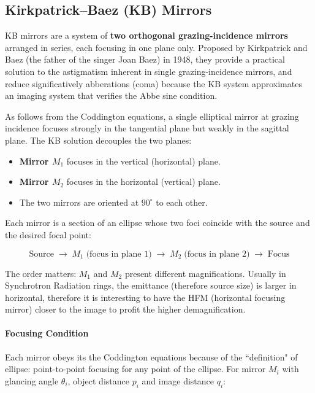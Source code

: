 \subsection{Kirkpatrick--Baez (KB) Mirrors}

\noindent
KB mirrors are a system of \textbf{two orthogonal grazing-incidence mirrors}
arranged in series, each focusing in one plane only. Proposed by Kirkpatrick
and Baez (the father of the singer Joan Baez) in 1948, they provide a practical solution to the astigmatism inherent in single grazing-incidence mirrors, and reduce significatively abberations (coma) because the KB system approximates an imaging system that verifies the Abbe sine condition.

As follows from the Coddington equations, a single elliptical mirror at
grazing incidence focuses strongly in the tangential plane but weakly in
the sagittal plane. The KB solution decouples the two planes:

\begin{itemize}
    \item \textbf{Mirror $M_1$} focuses in the vertical (horizontal) plane.
    \item \textbf{Mirror $M_2$} focuses in the horizontal (vertical) plane.
    \item The two mirrors are oriented at $90^\circ$ to each other.
\end{itemize}

\noindent
Each mirror is a section of an ellipse whose two foci coincide with the
source and the desired focal point:

\begin{equation*}
    \text{Source}
    \;\longrightarrow\;
    \boxed{M_1 \;\text{(focus in plane 1)}}
    \;\longrightarrow\;
    \boxed{M_2 \;\text{(focus in plane 2)}}
    \;\longrightarrow\;
    \text{Focus}
\end{equation*}

\noindent
The order matters: $M_1$ and $M_2$ present different magnifications. Usually in Synchrotron Radiation rings, the emittance (therefore source size) is larger in horizontal, therefore it is interesting to have the HFM (horizontal focusing mirror) closer to the image to profit the higher demagnification.

\paragraph{Focusing Condition}

Each mirror obeys its the Coddington equations because of the ``definition" of ellipse: point-to-point focusing for any point of the ellipse. For mirror $M_i$
with glancing angle $\theta_i$, object distance
$p_i$ and image distance $q_i$:

